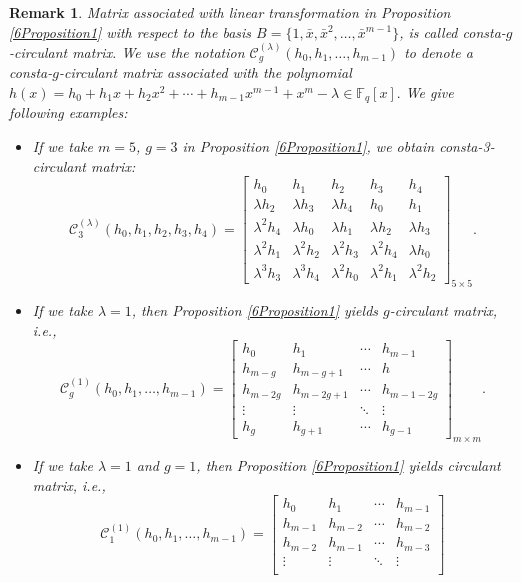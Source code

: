 \documentclass[12pt]{article}
\newtheorem{remark}{Remark}
\begin{document}
\begin{remark}
	Matrix associated with linear transformation in Proposition \ref{6Proposition1} with respect to the  basis $B=\{1,\bar{x},\bar{x}^2,\dots,\bar{x}^{m-1}\}$, is called consta-$g$-circulant matrix. 	We use the notation $\mathcal{C}_g^{(\lambda)}(h_0, h_1, \ldots, h_{m-1})$ to denote a consta-$g$-circulant matrix associated with the polynomial 
	$
	h(x) = h_0 + h_1 x + h_2 x^2 + \cdots + h_{m-1} x^{m-1} +x^m-\lambda \in \mathbb{F}_q[x].
	$  
	 We give following examples:
	\begin{itemize}
		\item[(i)] If we take $m=5$, $g=3$ in Proposition \ref{6Proposition1}, we obtain  \textit{consta-3-circulant matrix:}
		$$\mathcal{C}_3^{(\lambda)}(h_0, h_1,h_2,h_3,h_4)=\begin{bmatrix}
			h_0&h_1&h_2&h_3&h_4\\
			\lambda h_2&\lambda h_3&\lambda h_4&h_0&h_1\\
			\lambda^2h_4&\lambda h_0&\lambda h_1&\lambda h_2&\lambda h_3\\
			\lambda^2h_1&	\lambda^2h_2&	\lambda^2h_3&	\lambda^2h_4&	\lambda h_0\\
				\lambda^3h_3&	\lambda^3h_4&	\lambda^2h_0&	\lambda^2h_1&	\lambda^2h_2
		\end{bmatrix}_{5\times 5}.$$ 
		\item [(ii)] If we take $\lambda=1$, then Proposition \ref{6Proposition1} yields \textit{$g$-circulant matrix}, i.e., 
		$$\mathcal{C}_g^{(1)}(h_0, h_1, \ldots, h_{m-1})=\begin{bmatrix}
			h_0&h_1&\cdots &h_{m-1}\\
			h_{m-g}&h_{m-g+1}&\cdots&h\\
			h_{m-2g}&h_{m-2g+1}&\cdots&h_{m-1-2g}\\
			\vdots&\vdots&\ddots&\vdots\\
			h_g&h_{g+1}&\cdots&h_{g-1}
					\end{bmatrix}_{m \times m}.$$ 
						\item [(iii)] If we take $\lambda=1$ and $g=1$, then Proposition \ref{6Proposition1} yields \textit{circulant matrix}, i.e., 
					$$\mathcal{C}_1^{(1)}(h_0, h_1, \ldots, h_{m-1})=\begin{bmatrix}
						h_0&h_1&\cdots &h_{m-1}\\
						h_{m-1}&h_{m-2}&\cdots&h_{m-2}\\
						h_{m-2}&h_{m-1}&\cdots&h_{m-3}\\
						\vdots&\vdots&\ddots&\vdots\\

\end{bmatrix}$$
\end{itemize}
\end{remark}
\end{document}
